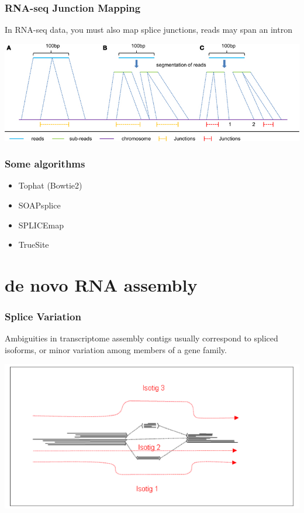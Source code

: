 \documentclass[pdf]{beamer}
\begin{document}
\begin{frame}
\frametitle{RNA-seq Junction Mapping}
\alert{In RNA-seq data, you must also map splice junctions, reads may span an intron}
\begin{center}
\includegraphics[scale=0.4]{Figures/junctions.jpg} 
\end{center}
\end{frame}

\begin{frame}
\frametitle{Some algorithms}
\begin{itemize}
\item Tophat (Bowtie2)
\item SOAPsplice
\item SPLICEmap
\item TrueSite
\end{itemize}
\end{frame}


\section{de novo RNA assembly}
\begin{frame}
\frametitle{Splice Variation}
Ambiguities in transcriptome assembly contigs usually correspond to spliced isoforms, or minor variation among members of a gene family.
\begin{center}
\includegraphics[scale=0.4]{Figures/spliceVariation.png} 
\end{center}
\end{frame}
\end{document}
